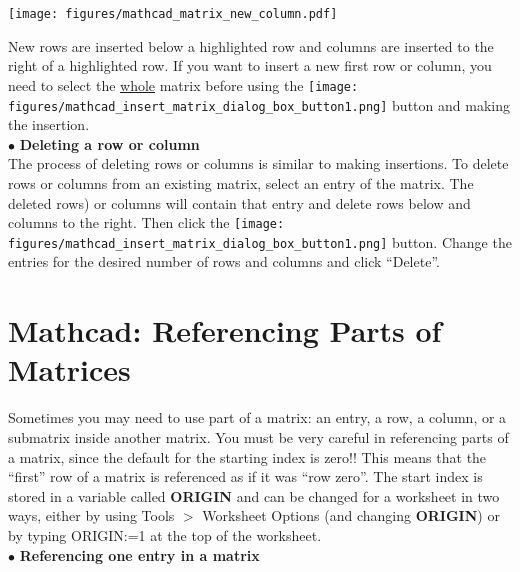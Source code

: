 \begin{center}
\texttt{[image: figures/mathcad\_matrix\_new\_column.pdf]} %
\end{center}

New rows are inserted below a highlighted row and columns are inserted to the right of a highlighted row. If you want to insert a new first row or column, you need to select the \underline{whole} matrix before using the \texttt{[image: figures/mathcad\_insert\_matrix\_dialog\_box\_button1.png]} button and making the insertion.\\


$\bullet$ \textbf{Deleting a row or column}\\

The process of deleting rows or columns is similar to making insertions. To delete rows or columns from an existing matrix, select an entry of the matrix.  The deleted rows) or columns will contain that entry and delete rows below and columns to the right.  Then click the \texttt{[image: figures/mathcad\_insert\_matrix\_dialog\_box\_button1.png]} button.  Change the entries for the desired number of rows and columns and click ``Delete''.  \\

\section{Mathcad: Referencing Parts of Matrices}\label{sec:Mathcad_matrices3}


Sometimes you may need to use part of a matrix: an entry, a row, a column, or a submatrix inside another matrix.  You must be very careful in referencing parts of a matrix, since the default for the starting index is zero!!  This means that the ``first'' row of a matrix is referenced as if it was ``row zero''.  The start index is stored in a variable called \textbf{ORIGIN} and can be changed for a worksheet in two ways, either by using Tools $>$ Worksheet Options (and changing \textbf{ORIGIN}) or by typing ORIGIN:=1 at the top of the worksheet.\\

$\bullet$ \textbf{Referencing one entry in a matrix}\\

